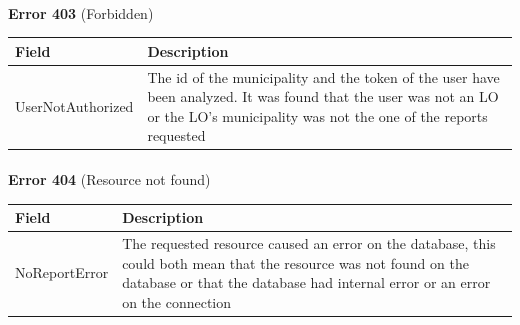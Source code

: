 						\paragraph{}
							\textbf{Error 403} (Forbidden)
							\begin{table}[!h]
								\begin{tabular}{L{0.4\textwidth}L{0.4\textwidth}}
									\toprule
									Field & Description \\
									\midrule
								  	UserNotAuthorized & The id of the municipality and the token of the user have been analyzed. It was found that the user was not an LO or the LO's  municipality was not the one of the reports requested  \\
								 	\bottomrule
								\end{tabular}
							\end{table}
						\paragraph{}
							\textbf{Error 404} (Resource not found)
							\begin{table}[!h]
								\begin{tabular}{L{0.4\textwidth}L{0.4\textwidth}}
									\toprule
									Field & Description \\
									\midrule
								  	 NoReportError & The requested resource caused an error on the database, this could both mean that the resource was not found on the database or that the database had internal error or an error on the connection \\ 
								 	\bottomrule
								\end{tabular}
							\end{table}